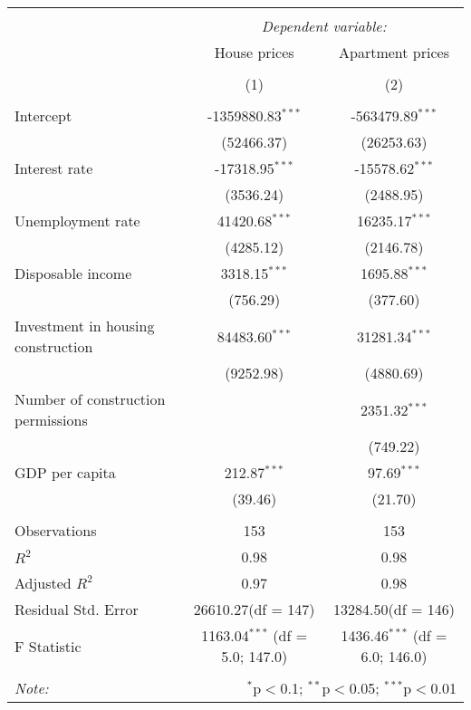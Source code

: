 \begin{table}[!htbp] \centering
\begin{tabular}{@{\extracolsep{5pt}}lcc}
\\[-1.8ex]\hline
\hline \\[-1.8ex]
& \multicolumn{2}{c}{\textit{Dependent variable:}} \
\cr \cline{2-3}
\\[-1.8ex] & \multicolumn{1}{c}{House prices} & \multicolumn{1}{c}{Apartment prices}  \\
\\[-1.8ex] & (1) & (2) \\
\hline \\[-1.8ex]
 Intercept & -1359880.83$^{***}$ & -563479.89$^{***}$ \\
  & (52466.37) & (26253.63) \\
 Interest rate & -17318.95$^{***}$ & -15578.62$^{***}$ \\
  & (3536.24) & (2488.95) \\
 Unemployment rate & 41420.68$^{***}$ & 16235.17$^{***}$ \\
  & (4285.12) & (2146.78) \\
 Disposable income & 3318.15$^{***}$ & 1695.88$^{***}$ \\
  & (756.29) & (377.60) \\
 Investment in housing construction & 84483.60$^{***}$ & 31281.34$^{***}$ \\
  & (9252.98) & (4880.69) \\
 Number of construction permissions & & 2351.32$^{***}$ \\
  & & (749.22) \\
 GDP per capita & 212.87$^{***}$ & 97.69$^{***}$ \\
  & (39.46) & (21.70) \\
\hline \\[-1.8ex]
 Observations & 153 & 153 \\
 $R^2$ & 0.98 & 0.98 \\
 Adjusted $R^2$ & 0.97 & 0.98 \\
 Residual Std. Error & 26610.27(df = 147) & 13284.50(df = 146)  \\
 F Statistic & 1163.04$^{***}$ (df = 5.0; 147.0) & 1436.46$^{***}$ (df = 6.0; 146.0) \\
\hline
\hline \\[-1.8ex]
\textit{Note:} & \multicolumn{2}{r}{$^{*}$p$<$0.1; $^{**}$p$<$0.05; $^{***}$p$<$0.01} \\
\end{tabular}
\end{table}